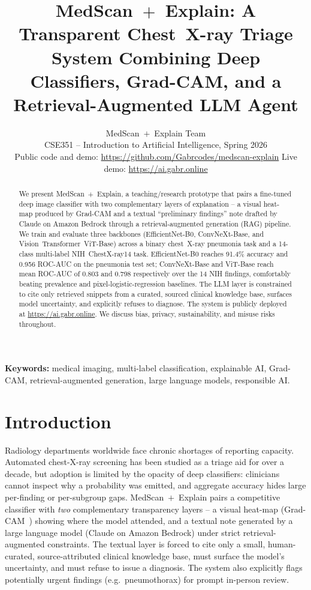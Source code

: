 \documentclass[10pt,journal,onecolumn]{IEEEtran}
\title{MedScan~$+$~Explain: A Transparent Chest~X-ray Triage System Combining Deep Classifiers, Grad-CAM, and a Retrieval-Augmented LLM Agent}
\author{MedScan~$+$~Explain Team\\CSE351 -- Introduction to Artificial Intelligence, Spring 2026\\Public code and demo: \url{https://github.com/Gabrcodes/medscan-explain} \quad Live demo: \url{https://ai.gabr.online}}
\begin{document}
\maketitle

\begin{abstract}
We present MedScan~$+$~Explain, a teaching/research prototype that pairs a fine-tuned deep image classifier with two complementary layers of explanation -- a visual heat-map produced by Grad-CAM and a textual ``preliminary findings'' note drafted by Claude on Amazon Bedrock through a retrieval-augmented generation (RAG) pipeline. We train and evaluate three backbones (EfficientNet-B0, ConvNeXt-Base, and Vision~Transformer~ViT-Base) across a binary chest~X-ray pneumonia task and a 14-class multi-label NIH~ChestX-ray14 task. EfficientNet-B0 reaches 91.4\% accuracy and 0.956 ROC-AUC on the pneumonia test set; ConvNeXt-Base and ViT-Base reach mean ROC-AUC of 0.803 and 0.798 respectively over the 14 NIH findings, comfortably beating prevalence and pixel-logistic-regression baselines. The LLM layer is constrained to cite only retrieved snippets from a curated, sourced clinical knowledge base, surfaces model uncertainty, and explicitly refuses to diagnose. The system is publicly deployed at \url{https://ai.gabr.online}. We discuss bias, privacy, sustainability, and misuse risks throughout.
\end{abstract}

\textbf{Keywords:} medical imaging, multi-label classification, explainable AI, Grad-CAM, retrieval-augmented generation, large language models, responsible AI.

\section{Introduction}

Radiology departments worldwide face chronic shortages of reporting capacity. Automated chest-X-ray screening has been studied as a triage aid for over a decade, but adoption is limited by the opacity of deep classifiers: clinicians cannot inspect why a probability was emitted, and aggregate accuracy hides large per-finding or per-subgroup gaps. MedScan~$+$~Explain pairs a competitive classifier with \emph{two} complementary transparency layers -- a visual heat-map (Grad-CAM~\cite{selvaraju2017gradcam}) showing where the model attended, and a textual note generated by a large language model (Claude on Amazon Bedrock) under strict retrieval-augmented constraints. The textual layer is forced to cite only a small, human-curated, source-attributed clinical knowledge base, must surface the model's uncertainty, and must refuse to issue a diagnosis. The system also explicitly flags potentially urgent findings (e.g.\ pneumothorax) for prompt in-person review.
\end{document}
